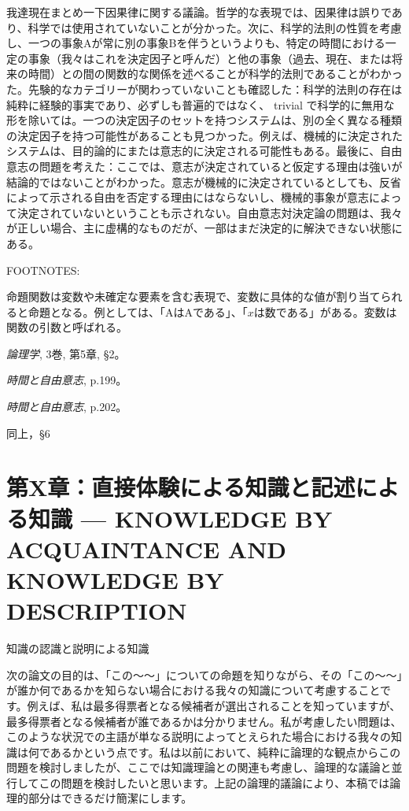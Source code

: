 \documentclass[a4paper,11pt,openany]{ltjsbook}
\begin{document}
我達現在まとめ一下因果律に関する議論。哲学的な表現では、因果律は誤りであり、科学では使用されていないことが分かった。次に、科学的法則の性質を考慮し、一つの事象Aが常に別の事象Bを伴うというよりも、特定の時間における一定の事象（我々はこれを決定因子と呼んだ）と他の事象（過去、現在、または将来の時間）との間の関数的な関係を述べることが科学的法則であることがわかった。先験的なカテゴリーが関わっていないことも確認した：科学的法則の存在は純粋に経験的事実であり、必ずしも普遍的ではなく、 trivial で科学的に無用な形を除いては。一つの決定因子のセットを持つシステムは、別の全く異なる種類の決定因子を持つ可能性があることも見つかった。例えば、機械的に決定されたシステムは、目的論的にまたは意志的に決定される可能性もある。最後に、自由意志の問題を考えた：ここでは、意志が決定されていると仮定する理由は強いが結論的ではないことがわかった。意志が機械的に決定されているとしても、反省によって示される自由を否定する理由にはならないし、機械的事象が意志によって決定されていないということも示されない。自由意志対決定論の問題は、我々が正しい場合、主に虚構的なものだが、一部はまだ決定的に解決できない状態にある。

FOOTNOTES:

 命題関数は変数や未確定な要素を含む表現で、変数に具体的な値が割り当てられると命題となる。例としては、「AはAである」、「$x$は数である」がある。変数は関数の引数と呼ばれる。

 \textit{論理学}, 3巻, 第5章, §2。

 \textit{時間と自由意志}, p.199。

 \textit{時間と自由意志}, p.202。

 同上，§6


\chapter{第X章：直接体験による知識と記述による知識 --- {KNOWLEDGE BY ACQUAINTANCE AND KNOWLEDGE BY DESCRIPTION}}

知識の認識と説明による知識


次の論文の目的は、「この～～」についての命題を知りながら、その「この～～」が誰か何であるかを知らない場合における我々の知識について考慮することです。例えば、私は最多得票者となる候補者が選出されることを知っていますが、最多得票者となる候補者が誰であるかは分かりません。私が考慮したい問題は、このような状況での主語が単なる説明によってとえられた場合における我々の知識は何であるかという点です。私は以前において、純粋に論理的な観点からこの問題を検討しましたが、ここでは知識理論との関連も考慮し、論理的な議論と並行してこの問題を検討したいと思います。上記の論理的議論により、本稿では論理的部分はできるだけ簡潔にします。
\end{document}
